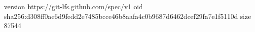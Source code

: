 version https://git-lfs.github.com/spec/v1
oid sha256:d308ff0ae6d9fedd2e7485bcce46b8aafa4c0b9687d6462dcef29fa7e1f5110d
size 87544
